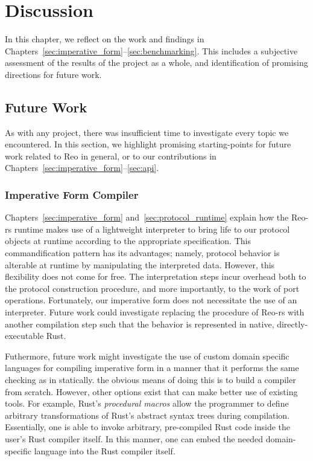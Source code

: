 \chapter{Discussion}
In this chapter, we reflect on the work and findings in Chapters~\ref{sec:imperative_form}--\ref{sec:benchmarking}. This includes a subjective assessment of the results of the project as a whole, and identification of promising directions for future work.

\label{sec:discussion}
\section{Future Work}
As with any project, there was insufficient time to investigate every topic we encountered. In this section, we highlight promising starting-points for future work related to Reo in general, or to our contributions in Chapters~\ref{sec:imperative_form}--\ref{sec:api}.

\subsection{Imperative Form Compiler}
Chapters~\ref{sec:imperative_form} and~\ref{sec:protocol_runtime} explain how the Reo-rs runtime makes use of a lightweight interpreter to bring life to our protocol objects at runtime according to the appropriate specification. This commandification pattern has its advantages; namely, protocol behavior is alterable at runtime by manipulating the interpreted data. However, this flexibility does not come for free. The interpretation steps incur overhead both to the protocol construction procedure, and more importantly, to the work of port operations. Fortunately, our imperative form does not necessitate the use of an interpreter. Future work could investigate replacing the  procedure of Reo-rs with another compilation step such that the behavior is represented in native, directly-executable Rust. 

Futhermore, future work might investigate the use of custom domain specific languages for compiling imperative form in a manner that it performs the same checking as in  statically. the obvious means of doing this is to build a compiler from scratch. However, other options exist that can make better use of existing tools. For example, Rust's \textit{procedural macros} allow the programmer to define arbitrary transformations of Rust's abstract syntax trees during compilation. Essentially, one is able to invoke arbitrary, pre-compiled Rust code inside the user's Rust compiler itself. In this manner, one can embed the needed domain-specific language into the Rust compiler itself.

